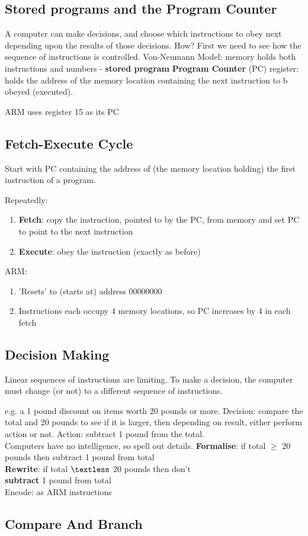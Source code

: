 \documentclass{article} %
\begin{document}
\subsection{Stored programs and the Program Counter}
A computer can make decisions, and choose which instructions to obey next depending upon the results of those decisions. How? First we need to see how the sequence of instructions is controlled. Von-Neumann Model: memory holds both instructions and numbers - \textbf{stored program} \textbf{Program Counter} (PC) register: holds the address of the memory location containing the next instruction to b obeyed (executed).

ARM uses register 15 as its PC

\subsection{Fetch-Execute Cycle}
Start with PC containing the address of (the memory location holding) the first instruction of a program.

Repeatedly:
\begin{enumerate}
	\item \textbf{Fetch}: copy the instruction, pointed to by the PC, from memory and set PC to point to the next instruction
	\item \textbf{Execute}:  obey the instruction (exactly as before)
\end{enumerate}
ARM:
\begin{enumerate}
	\item 'Resets' to (starts at) address 00000000
	\item Instructions each occupy 4 memory locations, so PC increases by 4 in each fetch
\end{enumerate}

\subsection{Decision Making}
Linear sequences of instructions are limiting. To make a decision, the computer must change (or not) to a
different sequence of instructions.

e.g. a 1 pound discount on items worth 20 pounds or more.
Decision: compare the total and 20 pounds to see if it is larger, then depending on result, either perform action or not.
Action: subtract 1 pound from the total.\\

Computers have no intelligence, so spell out details.
\textbf{Formalise}: if total \(\geq\) 20 pounds then subtract 1 pound from total\\
\textbf{Rewrite}: if total \(\textless\) 20 pounds then don’t\\
\textbf{subtract} 1 pound from total\\
Encode: as ARM instructions

\subsection{Compare And Branch}
\end{document}
